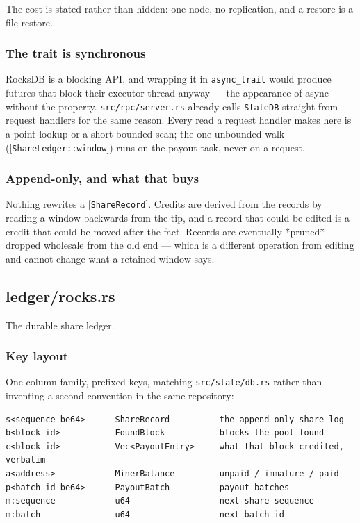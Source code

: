 \documentclass[11pt,a4paper]{article}
\begin{document}
The cost is stated rather than hidden: one node, no replication, and a
restore is a file restore.

\subsubsection{The trait is synchronous}

RocksDB is a blocking API, and wrapping it in \texttt{async\_trait} would produce
futures that block their executor thread anyway — the appearance of async
without the property. \texttt{src/rpc/server.rs} already calls \texttt{StateDB} straight
from request handlers for the same reason. Every read a request handler
makes here is a point lookup or a short bounded scan; the one unbounded walk
([\texttt{ShareLedger::window}]) runs on the payout task, never on a request.

\subsubsection{Append-only, and what that buys}

Nothing rewrites a [\texttt{ShareRecord}]. Credits are derived from the records by
reading a window backwards from the tip, and a record that could be edited
is a credit that could be moved after the fact. Records are eventually
*pruned* — dropped wholesale from the old end — which is a different
operation from editing and cannot change what a retained window says.

\subsection{ledger/rocks.rs}
The durable share ledger.

\subsubsection{Key layout}

One column family, prefixed keys, matching \texttt{src/state/db.rs} rather than
inventing a second convention in the same repository:

\begin{verbatim}
s<sequence be64>      ShareRecord          the append-only share log
b<block id>           FoundBlock           blocks the pool found
c<block id>           Vec<PayoutEntry>     what that block credited, verbatim
a<address>            MinerBalance         unpaid / immature / paid
p<batch id be64>      PayoutBatch          payout batches
m:sequence            u64                  next share sequence
m:batch               u64                  next batch id
\end{verbatim}
\end{document}

